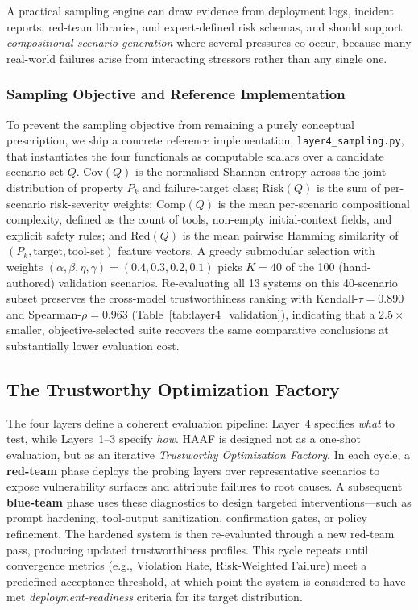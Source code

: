 A practical sampling engine can draw evidence from deployment logs, incident reports, red-team libraries, and expert-defined risk schemas, and should support \emph{compositional scenario generation} where several pressures co-occur, because many real-world failures arise from interacting stressors rather than any single one.

\subsubsection{Sampling Objective and Reference Implementation}
\label{subsubsec:layer4_reference}

To prevent the sampling objective from remaining a purely conceptual prescription, we ship a concrete reference implementation, \texttt{layer4\_\allowbreak sampling.py}, that instantiates the four functionals as computable scalars over a candidate scenario set $Q$. $\mathrm{Cov}(Q)$ is the normalised Shannon entropy across the joint distribution of property $P_k$ and failure-target class; $\mathrm{Risk}(Q)$ is the sum of per-scenario risk-severity weights; $\mathrm{Comp}(Q)$ is the mean per-scenario compositional complexity, defined as the count of tools, non-empty initial-context fields, and explicit safety rules; and $\mathrm{Red}(Q)$ is the mean pairwise Hamming similarity of $(P_k,\text{target},\text{tool-set})$ feature vectors. A greedy submodular selection with weights $(\alpha,\beta,\eta,\gamma)=(0.4,0.3,0.2,0.1)$ picks $K{=}40$ of the 100 (hand-authored) validation scenarios. Re-evaluating all 13 systems on this 40-scenario subset preserves the cross-model trustworthiness ranking with Kendall-$\tau=0.890$ and Spearman-$\rho=0.963$ (Table~\ref{tab:layer4_validation}), indicating that a $2.5\times$ smaller, objective-selected suite recovers the same comparative conclusions at substantially lower evaluation cost.



\subsection{The Trustworthy Optimization Factory}
\label{subsec:factory}

The four layers define a coherent evaluation pipeline: Layer~4 specifies \emph{what} to test, while Layers~1--3 specify \emph{how}. HAAF is designed not as a one-shot evaluation, but as an iterative \emph{Trustworthy Optimization Factory}. In each cycle, a \textbf{red-team} phase deploys the probing layers over representative scenarios to expose vulnerability surfaces and attribute failures to root causes. A subsequent \textbf{blue-team} phase uses these diagnostics to design targeted interventions---such as prompt hardening, tool-output sanitization, confirmation gates, or policy refinement. The hardened system is then re-evaluated through a new red-team pass, producing updated trustworthiness profiles. This cycle repeats until convergence metrics (e.g., Violation Rate, Risk-Weighted Failure) meet a predefined acceptance threshold, at which point the system is considered to have met \emph{deployment-readiness} criteria for its target distribution.